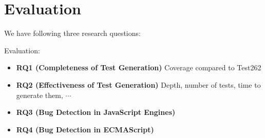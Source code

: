 \section{Evaluation}\label{sec:eval}

We have following three research questions:

Evaluation:
\begin{itemize}
  \item {\bf RQ1 (Completeness of Test Generation)} Coverage compared to Test262
  \item {\bf RQ2 (Effectiveness of Test Generation)} Depth, number of tests,
    time to generate them, $\cdots$
  \item {\bf RQ3 (Bug Detection in JavaScript Engines)}
  \item {\bf RQ4 (Bug Detection in ECMAScript)}
\end{itemize}

